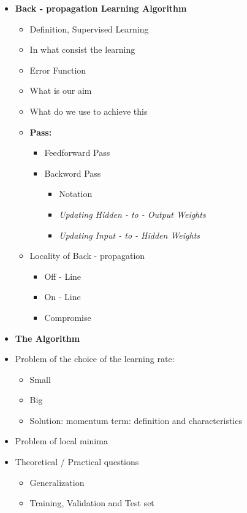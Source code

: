 \begin{itemize}
    \item \textbf{Back - propagation Learning Algorithm}
    \begin{itemize}
        \item Definition, Supervised Learning
        \item In what consist the learning
        \item Error Function
        \item What is our aim
        \item What do we use to achieve this
        \item \textbf{Pass:}
        \begin{itemize}
            \item Feedforward Pass
            \item Backword Pass
            \begin{itemize}
                \item Notation
                \item \textit{Updating Hidden - to - Output Weights}
                \item \textit{Updating Input - to - Hidden Weights}
            \end{itemize}
        \end{itemize}
        \item Locality of Back - propagation
        \begin{itemize}
            \item Off - Line
            \item On - Line
            \item Compromise
        \end{itemize}
    \end{itemize}
    \item \textbf{The Algorithm}
    \item Problem of the choice of the learning rate:
    \begin{itemize}
        \item Small
        \item Big
        \item Solution: momentum term: definition and characteristics
    \end{itemize}
    \item Problem of local minima
    \item Theoretical / Practical questions
    \begin{itemize}
        \item Generalization
        \item Training, Validation and Test set

\end{itemize}
\end{itemize}
